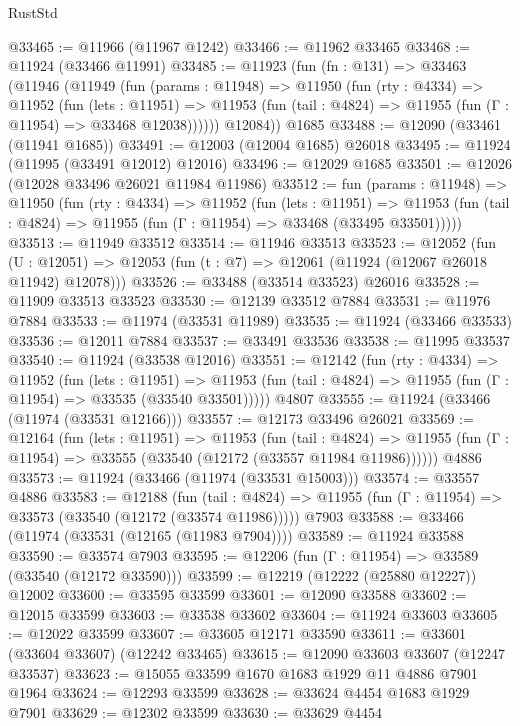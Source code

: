\begin{lexlean}{RustStd}
\begin{coremodule}
@33465 := @11966 (@11967 @1242)
@33466 := @11962 @33465
@33468 := @11924 (@33466 @11991)
@33485 := @11923
    (fun (fn : @131) =>
    @33463
      (@11946
        (@11949
          (fun (params : @11948) =>
          @11950
            (fun (rty : @4334) =>
            @11952
              (fun (lets : @11951) =>
              @11953 (fun (tail : @4824) => @11955 (fun (Γ : @11954) => @33468 @12038))))))
        @12084))
    @1685
@33488 := @12090 (@33461 (@11941 @1685))
@33491 := @12003 (@12004 @1685) @26018
@33495 := @11924 (@11995 (@33491 @12012) @12016)
@33496 := @12029 @1685
@33501 := @12026 (@12028 @33496 @26021 @11984 @11986)
@33512 := fun (params : @11948) =>
  @11950
    (fun (rty : @4334) =>
    @11952
      (fun (lets : @11951) =>
      @11953 (fun (tail : @4824) => @11955 (fun (Γ : @11954) => @33468 (@33495 @33501)))))
@33513 := @11949 @33512
@33514 := @11946 @33513
@33523 := @12052
    (fun (U : @12051) => @12053 (fun (t : @7) => @12061 (@11924 (@12067 @26018 @11942) @12078)))
@33526 := @33488 (@33514 @33523) @26016
@33528 := @11909 @33513 @33523
@33530 := @12139 @33512 @7884
@33531 := @11976 @7884
@33533 := @11974 (@33531 @11989)
@33535 := @11924 (@33466 @33533)
@33536 := @12011 @7884
@33537 := @33491 @33536
@33538 := @11995 @33537
@33540 := @11924 (@33538 @12016)
@33551 := @12142
    (fun (rty : @4334) =>
    @11952
      (fun (lets : @11951) =>
      @11953 (fun (tail : @4824) => @11955 (fun (Γ : @11954) => @33535 (@33540 @33501)))))
    @4807
@33555 := @11924 (@33466 (@11974 (@33531 @12166)))
@33557 := @12173 @33496 @26021
@33569 := @12164
    (fun (lets : @11951) =>
    @11953
      (fun (tail : @4824) =>
      @11955 (fun (Γ : @11954) => @33555 (@33540 (@12172 (@33557 @11984 @11986))))))
    @4886
@33573 := @11924 (@33466 (@11974 (@33531 @15003)))
@33574 := @33557 @4886
@33583 := @12188
    (fun (tail : @4824) => @11955 (fun (Γ : @11954) => @33573 (@33540 (@12172 (@33574 @11986)))))
    @7903
@33588 := @33466 (@11974 (@33531 (@12165 (@11983 @7904))))
@33589 := @11924 @33588
@33590 := @33574 @7903
@33595 := @12206 (fun (Γ : @11954) => @33589 (@33540 (@12172 @33590)))
@33599 := @12219 (@12222 (@25880 @12227)) @12002
@33600 := @33595 @33599
@33601 := @12090 @33588
@33602 := @12015 @33599
@33603 := @33538 @33602
@33604 := @11924 @33603
@33605 := @12022 @33599
@33607 := @33605 @12171 @33590
@33611 := @33601 (@33604 @33607) (@12242 @33465)
@33615 := @12090 @33603 @33607 (@12247 @33537)
@33623 := @15055 @33599 @1670 @1683 @1929 @11 @4886 @7901 @1964
@33624 := @12293 @33599
@33628 := @33624 @4454 @1683 @1929 @7901
@33629 := @12302 @33599
@33630 := @33629 @4454

\end{coremodule}
\end{lexlean}
